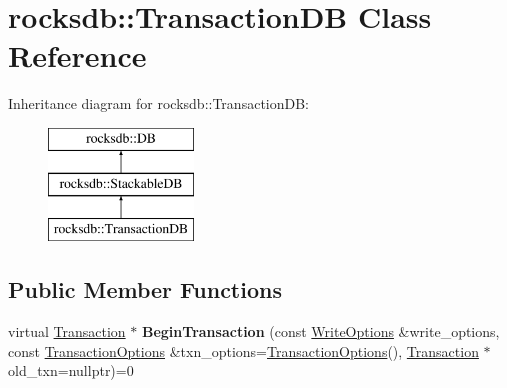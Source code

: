 \hypertarget{classrocksdb_1_1TransactionDB}{}\section{rocksdb\+:\+:Transaction\+DB Class Reference}
\label{classrocksdb_1_1TransactionDB}
Inheritance diagram for rocksdb\+:\+:Transaction\+DB\+:\begin{figure}[H]
\begin{center}
\leavevmode
\includegraphics[height=3.000000cm]{classrocksdb_1_1TransactionDB}
\end{center}
\end{figure}
\subsection*{Public Member Functions}
\begin{DoxyCompactItemize}
\item 
virtual \hyperlink{classrocksdb_1_1Transaction}{Transaction} $\ast$ {\bfseries Begin\+Transaction} (const \hyperlink{structrocksdb_1_1WriteOptions}{Write\+Options} \&write\+\_\+options, const \hyperlink{structrocksdb_1_1TransactionOptions}{Transaction\+Options} \&txn\+\_\+options=\hyperlink{structrocksdb_1_1TransactionOptions}{Transaction\+Options}(), \hyperlink{classrocksdb_1_1Transaction}{Transaction} $\ast$old\+\_\+txn=nullptr)=0\hypertarget{classrocksdb_1_1TransactionDB_aab5cb59e7b7182cb145b0cf2ba65a94b}{}\label{classrocksdb_1_1TransactionDB_aab5cb59e7b7182cb145b0cf2ba65a94b}

\end{DoxyCompactItemize}
